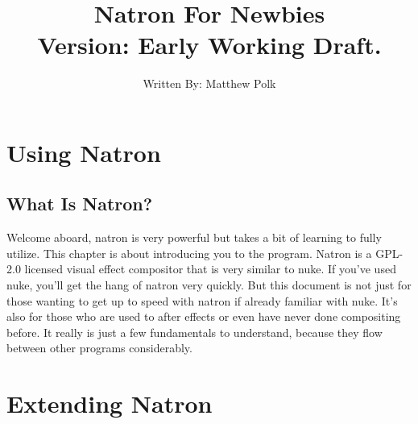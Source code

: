\documentclass[letterpaper,12pt,oneside]{book}
\title{Natron For Newbies\\Version: Early Working Draft.}
\author{Written By: Matthew Polk}
\date{}
\begin{document}
\renewcommand{\contentsname}{Table of Contents}
\frontmatter
\hypersetup{pageanchor=false}
\maketitle
\hypersetup{pageanchor=true}

\tableofcontents
\mainmatter
\pagestyle{plain}
\part{Using Natron}

\chapter{What Is Natron?}
Welcome aboard, natron is very powerful but takes a bit of learning to
fully utilize. This chapter is about introducing you to the program.
\bigbreak
Natron is a GPL-2.0 licensed visual effect compositor that is very similar to nuke. If you've used nuke, you'll get the hang of natron very quickly. But this document is not just for those wanting to get up to speed with natron if already familiar with nuke. It's also for those who are used to after effects or even have never done compositing before. It really is just a few fundamentals to understand, because they flow between other programs considerably.





\part{Extending Natron}
\end{document}
